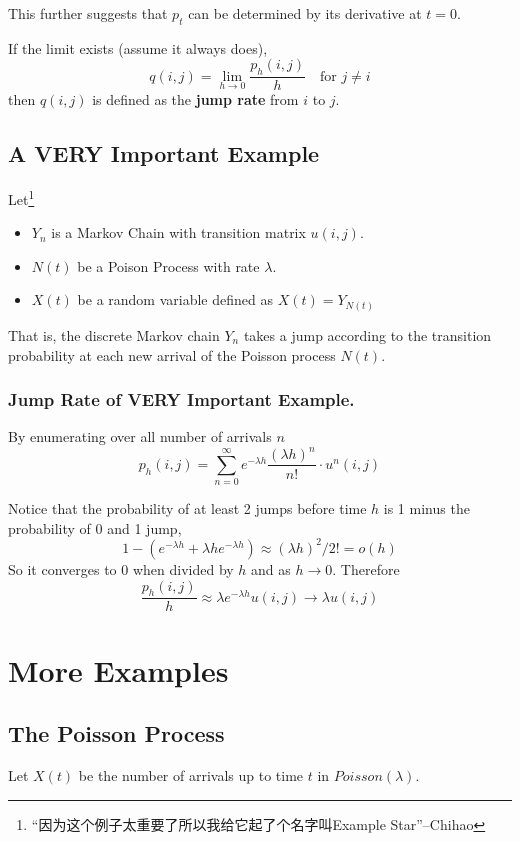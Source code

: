         This further suggests that $p_t$ can be determined by its derivative at $t=0$.
        \begin{definition}\label{Def:JumpRate}
            If the limit exists (assume it always does),
            \[ q(i,j) = \lim_{h \to 0}\frac{p_h(i,j)}{h} \quad \text{for $j \neq i$} \]
            then $q(i,j)$ is defined as the \textbf{jump rate} from $i$ to $j$.
        \end{definition}

    \subsection{A VERY Important Example}\label{Sub:CTMCCoreExample}
        Let\footnote{“因为这个例子太重要了所以我给它起了个名字叫Example Star”--Chihao}
        \begin{itemize}
            \item $Y_n$ is a Markov Chain with transition matrix $u(i,j)$.
            \item $N(t)$ be a Poison Process with rate $\lambda$.
            \item $X(t)$ be a random variable defined as $X(t)=Y_{N(t)}$
        \end{itemize}
        That is, the discrete Markov chain $Y_n$ takes a jump according to the transition probability at each new arrival of the Poisson process $N(t)$.

        \subsubsection{Jump Rate of VERY Important Example.}
        By enumerating over all number of arrivals $n$
        \[ p_h(i,j) = \sum_{n=0}^\infty e^{-\lambda h}\frac{(\lambda h)^n}{n!} \cdot u^n(i,j) \]

        Notice that the probability of at least 2 jumps before time $h$ is 1 minus the probability of 0 and 1 jump,
        \[ 1 - (e^{-\lambda h}+\lambda h e^{-\lambda h}) \approx (\lambda h)^2/2! = o(h) \]
        So it converges to 0 when divided by $h$ and as $h \to 0$.
        Therefore
        \[ \frac{p_h(i,j)}{h} \approx \lambda e^{-\lambda h}u(i,j) \to \lambda u(i,j) \]


\section{More Examples}
    \subsection{The Poisson Process}
        Let $X(t)$ be the number of arrivals up to time $t$ in $Poisson(\lambda)$.

